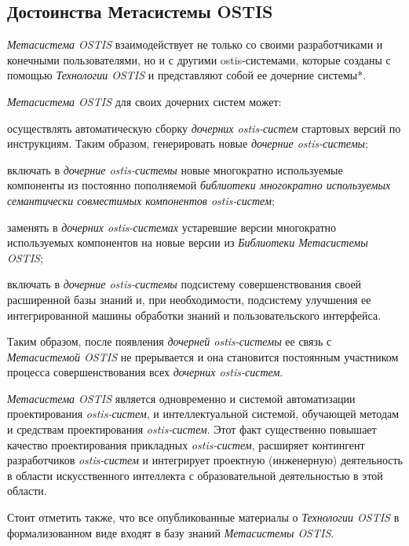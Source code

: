 \subsection{Достоинства Метасистемы OSTIS}
\label{ims_advantages}

\textit{Метасистема OSTIS} взаимодействует не только со своими разработчиками и конечными пользователями, но и с другими ostis-системами, которые созданы с помощью \textit{Технологии OSTIS} и представляют собой ее дочерние системы*. 

\textit{Метасистема OSTIS} для своих дочерних систем может:
\begin{textitemize}
	\item осуществлять автоматическую сборку \textit{дочерних ostis-систем} стартовых версий по инструкциям. Таким образом, генерировать новые \textit{дочерние ostis-системы};
	\item включать в \textit{дочерние ostis-системы} новые многократно используемые компоненты
	из постоянно пополняемой \textit{библиотеки многократно используемых семантически совместимых компонентов ostis-систем};
	\item заменять в \textit{дочерних ostis-системах} устаревшие версии многократно используемых компонентов на новые версии из \textit{Библиотеки Метасистемы OSTIS};
	\item включать в \textit{дочерние ostis-системы} подсистему совершенствования своей расширенной базы знаний и, при необходимости, подсистему улучшения ее интегрированной машины обработки знаний и пользовательского интерфейса.
\end{textitemize}

Таким образом, после появления \textit{дочерней ostis-системы} ее связь с \textit{Метасистемой OSTIS} не прерывается и она становится постоянным участником процесса совершенствования всех \textit{дочерних ostis-систем}.

\textit{Метасистема OSTIS} является одновременно и системой автоматизации проектирования \textit{ostis-систем}, и интеллектуальной системой, обучающей методам и средствам проектирования \textit{ostis-систем}. Этот факт существенно повышает качество проектирования прикладных \textit{ostis-систем}, расширяет контингент разработчиков \textit{ostis-систем} и интегрирует проектную (инженерную) деятельность в области искусственного интеллекта с образовательной деятельностью в этой области.

Стоит отметить также, что все опубликованные материалы о \textit{Технологии OSTIS} в формализованном виде входят в базу знаний \textit{Метасистемы OSTIS}.

